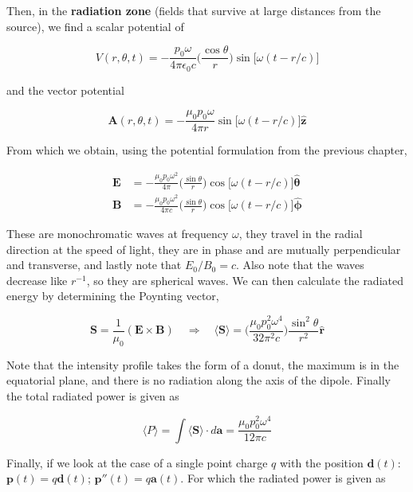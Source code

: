 \documentclass[a4paper]{article}
\begin{document}
Then, in the \textbf{radiation zone} (fields that survive at large distances from the source), we find a scalar potential of 

\begin{equation*}
    V(r, \theta, t)=-\frac{p_0\omega}{4\pi\epsilon_0 c}\bigg(\frac{\cos\theta}{r}\bigg)\sin\big[\omega(t-r/c)\big]
\end{equation*}

and the vector potential

\begin{equation*}
    \bm{A}(r, \theta, t)=-\frac{\mu_0p_0\omega}{4\pi r}\sin\big[\omega(t-r/c)\big]\bm{\hat{z}}
\end{equation*}

From which we obtain, using the potential formulation from the previous chapter,

\begin{align*}
    \bm{E}&=-\frac{\mu_0p_0\omega^2}{4\pi}\bigg(\frac{\sin\theta}{r}\bigg)\cos\big[\omega(t-r/c)\big]\bm{\hat{\theta}}\\[1em]
    \bm{B}&=-\frac{\mu_0p_0\omega^2}{4\pi c}\bigg(\frac{\sin\theta}{r}\bigg)\cos\big[\omega(t-r/c)\big]\bm{\hat{\phi}}
\end{align*}

These are monochromatic waves at frequency $\omega$, they travel in the radial direction at the speed of light, they are in phase and are mutually perpendicular and transverse, and lastly note that $E_0/B_0=c$. Also note that the waves decrease like $r^{-1}$, so they are spherical waves. We can then calculate the radiated energy by determining the Poynting vector,

\begin{equation*}
    \bm{S}=\frac{1}{\mu_0}(\bm{E}\times\bm{B})\quad\Rightarrow\quad \langle\bm{S}\rangle=\bigg(\frac{\mu_0p_0^2\omega^4}{32\pi^2 c}\bigg)\frac{\sin^2\theta}{r^2}\hat{\bm{r}}
\end{equation*}

Note that the intensity profile takes the form of a donut, the maximum is in the equatorial plane, and there is no radiation along the axis of the dipole. Finally the total radiated power is given as

\begin{equation*}
    \langle P\rangle=\int\langle\bm{S}\rangle\cdot d\bm{a}=\frac{\mu_0p_0^2\omega^4}{12\pi c}
\end{equation*}

Finally, if we look at the case of a single point charge $q$ with the position $\bm{d}(t)$: $\bm{p}(t)=q\bm{d}(t)$; $\bm{p}''(t)=q\bm{a}(t)$. For which the radiated power is given as
\end{document}
